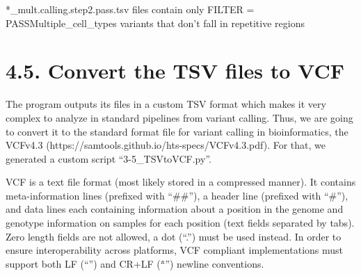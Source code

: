\documentclass[
  letterpaper,
  DIV=11,
  numbers=noendperiod]{scrreprt}
\begin{document}
\begin{tcolorbox}[enhanced jigsaw, coltitle=black, breakable, opacityback=0, colframe=quarto-callout-note-color-frame, colback=white, opacitybacktitle=0.6, bottomrule=.15mm, titlerule=0mm, rightrule=.15mm, leftrule=.75mm, toprule=.15mm, colbacktitle=quarto-callout-note-color!10!white, bottomtitle=1mm, left=2mm, toptitle=1mm, title=\textcolor{quarto-callout-note-color}{\faInfo}\hspace{0.5em}{Note:}, arc=.35mm]

*\_mult.calling.step2.pass.tsv files contain only FILTER =
PASS\textbar Multiple\_cell\_types variants that don't fall in
repetitive regions

\end{tcolorbox}

\section{4.5. Convert the TSV files to
VCF}\label{convert-the-tsv-files-to-vcf}

The program outputs its files in a custom TSV format which makes it very
complex to analyze in standard pipelines from variant calling. Thus, we
are going to convert it to the standard format file for variant calling
in bioinformatics, the VCFv4.3
(https://samtools.github.io/hts-specs/VCFv4.3.pdf). For that, we
generated a custom script ``3-5\_TSVtoVCF.py''.

\begin{tcolorbox}[enhanced jigsaw, coltitle=black, breakable, opacityback=0, colframe=quarto-callout-note-color-frame, colback=white, opacitybacktitle=0.6, bottomrule=.15mm, titlerule=0mm, rightrule=.15mm, leftrule=.75mm, toprule=.15mm, colbacktitle=quarto-callout-note-color!10!white, bottomtitle=1mm, left=2mm, toptitle=1mm, title=\textcolor{quarto-callout-note-color}{\faInfo}\hspace{0.5em}{What is a VCF?}, arc=.35mm]

VCF is a text file format (most likely stored in a compressed manner).
It contains meta-information lines (prefixed with ``\#\#''), a header
line (prefixed with ``\#''), and data lines each containing information
about a position in the genome and genotype information on samples for
each position (text fields separated by tabs). Zero length fields are
not allowed, a dot (``.'') must be used instead. In order to ensure
interoperability across platforms, VCF compliant implementations must
support both LF (``\n'') and CR+LF (``\r\n'') newline conventions.

\end{tcolorbox}
\end{document}
